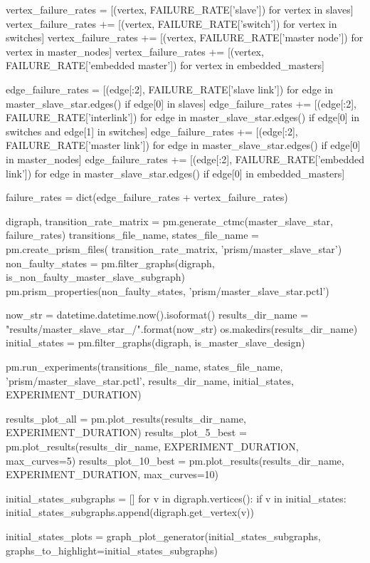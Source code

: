 \documentclass[times,a4paper,10pt,twocolumn]{article}
\theoremstyle{definition}
\theoremstyle{definition}
\theoremstyle{plain}
\begin{document}
\begin{sagesilent}

vertex_failure_rates = [(vertex, FAILURE_RATE['slave'])
    for vertex in slaves]
vertex_failure_rates += [(vertex, FAILURE_RATE['switch'])
    for vertex in switches]
vertex_failure_rates += [(vertex, FAILURE_RATE['master node'])
    for vertex in master_nodes]
vertex_failure_rates += [(vertex, FAILURE_RATE['embedded master'])
    for vertex in embedded_masters]

edge_failure_rates = [(edge[:2], FAILURE_RATE['slave link'])
    for edge in master_slave_star.edges() if edge[0] in slaves]
edge_failure_rates += [(edge[:2], FAILURE_RATE['interlink'])
    for edge in master_slave_star.edges() if edge[0] in switches and
    edge[1] in switches]
edge_failure_rates += [(edge[:2], FAILURE_RATE['master link'])
    for edge in master_slave_star.edges() if edge[0] in master_nodes]
edge_failure_rates += [(edge[:2], FAILURE_RATE['embedded link'])
    for edge in master_slave_star.edges() if edge[0] in embedded_masters]

failure_rates = dict(edge_failure_rates + vertex_failure_rates)

digraph, transition_rate_matrix = pm.generate_ctmc(master_slave_star,
    failure_rates)
transitions_file_name, states_file_name = pm.create_prism_files(
    transition_rate_matrix, 'prism/master_slave_star')
non_faulty_states = pm.filter_graphs(digraph,
    is_non_faulty_master_slave_subgraph)
pm.prism_properties(non_faulty_states, 'prism/master_slave_star.pctl')

now_str = datetime.datetime.now().isoformat()
results_dir_name = "results/master_slave_star_{}/".format(now_str)
os.makedirs(results_dir_name)
initial_states = pm.filter_graphs(digraph, is_master_slave_design)

pm.run_experiments(transitions_file_name, states_file_name,
    'prism/master_slave_star.pctl', results_dir_name,
    initial_states, EXPERIMENT_DURATION)

results_plot_all = pm.plot_results(results_dir_name, EXPERIMENT_DURATION)
results_plot_5_best = pm.plot_results(results_dir_name, EXPERIMENT_DURATION,
    max_curves=5)
results_plot_10_best = pm.plot_results(results_dir_name, EXPERIMENT_DURATION,
    max_curves=10)

initial_states_subgraphs = []
for v in digraph.vertices():
    if v in initial_states:
        initial_states_subgraphs.append(digraph.get_vertex(v))

initial_states_plots = graph_plot_generator(initial_states_subgraphs,
    graphs_to_highlight=initial_states_subgraphs)

\end{sagesilent}
\end{document}
